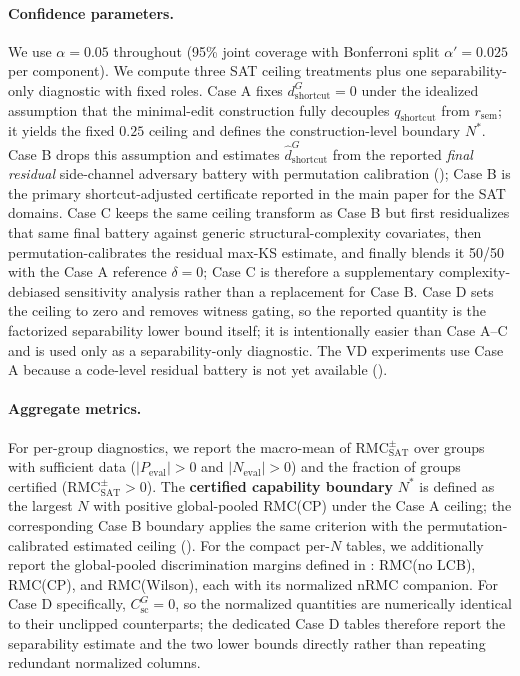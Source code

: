 \documentclass[conference]{IEEEtran}
\theoremstyle{remark}
\newcommand{\RMCSAT}{\mathrm{RMC}_{\mathrm{SAT}}}
\newcommand{\shortcutDisc}{d_{\mathrm{shortcut}}^{G}}
\newcommand{\hatshortcutDisc}{\hat d_{\mathrm{shortcut}}^{G}}
\newcommand{\shortcutCeiling}{C_{\mathrm{sc}}^{G}}
\newcommand{\reasonFac}{r_{\mathrm{sem}}}
\newcommand{\shortcutFac}{q_{\mathrm{shortcut}}}
\begin{document}
\paragraph{Confidence parameters.}
We use $\alpha = 0.05$ throughout (95\% joint coverage with Bonferroni split $\alpha'=0.025$ per component).
We compute three SAT ceiling treatments plus one separability-only diagnostic with fixed roles.  Case A fixes $\shortcutDisc=0$ under the idealized assumption that the minimal-edit construction fully decouples $\shortcutFac$ from $\reasonFac$; it yields the fixed $0.25$ ceiling and defines the construction-level boundary $N^*$.  Case B drops this assumption and estimates $\hatshortcutDisc$ from the reported \emph{final residual} side-channel adversary battery with permutation calibration (); Case B is the primary shortcut-adjusted certificate reported in the main paper for the SAT domains.  Case C keeps the same ceiling transform as Case B but first residualizes that same final battery against generic structural-complexity covariates, then permutation-calibrates the residual max-KS estimate, and finally blends it 50/50 with the Case A reference $\delta=0$; Case C is therefore a supplementary complexity-debiased sensitivity analysis rather than a replacement for Case B.  Case D sets the ceiling to zero and removes witness gating, so the reported quantity is the factorized separability lower bound itself; it is intentionally easier than Case A--C and is used only as a separability-only diagnostic.  The VD experiments use Case A because a code-level residual battery is not yet available ().

\paragraph{Aggregate metrics.}
For per-group diagnostics, we report the macro-mean of $\RMCSAT^{\pm}$ over groups with sufficient data ($|P_{\mathrm{eval}}|>0$ and $|N_{\mathrm{eval}}|>0$) and the fraction of groups certified ($\RMCSAT^{\pm}>0$).  The \textbf{certified capability boundary} $N^*$ is defined as the largest $N$ with positive global-pooled RMC(CP) under the Case A ceiling; the corresponding Case B boundary applies the same criterion with the permutation-calibrated estimated ceiling ().
For the compact per-$N$ tables, we additionally report the global-pooled discrimination margins defined in : RMC(no LCB), RMC(CP), and RMC(Wilson), each with its normalized $\mathrm{nRMC}$ companion.
For Case D specifically, $\shortcutCeiling=0$, so the normalized quantities are numerically identical to their unclipped counterparts; the dedicated Case D tables therefore report the separability estimate and the two lower bounds directly rather than repeating redundant normalized columns.
\end{document}
